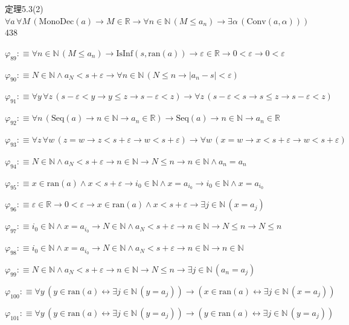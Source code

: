 \begin{fullproof}{定理5.3(2)}{$\forall a\,\forall M\,(\mathrm{MonoDec}(a) \to M \in \mathbb{R} \to \forall n \in \mathbb{N}\,(M \leq a_{n}) \to \exists \alpha\,(\mathrm{Conv}(a,\alpha)))$}{438}
\begin{abbrevlist}
\item $\varphi_{89} :\equiv \forall n \in \mathbb{N}\,(M \leq a_{n}) \to \mathrm{IsInf}(s,\mathrm{ran}(a)) \to \varepsilon \in \mathbb{R} \to 0 < \varepsilon \to 0 < \varepsilon$
\item $\varphi_{90} :\equiv N \in \mathbb{N} \land a_{N} < s + \varepsilon \to \forall n \in \mathbb{N}\,(N \leq n \to \lvert a_{n} - s \rvert < \varepsilon)$
\item $\varphi_{91} :\equiv \forall y\,\forall z\,(s - \varepsilon < y \to y \leq z \to s - \varepsilon < z) \to \forall z\,(s - \varepsilon < s \to s \leq z \to s - \varepsilon < z)$
\item $\varphi_{92} :\equiv \forall n\,(\mathrm{Seq}(a) \to n \in \mathbb{N} \to a_{n} \in \mathbb{R}) \to \mathrm{Seq}(a) \to n \in \mathbb{N} \to a_{n} \in \mathbb{R}$
\item $\varphi_{93} :\equiv \forall z\,\forall w\,(z = w \to z < s + \varepsilon \to w < s + \varepsilon) \to \forall w\,(x = w \to x < s + \varepsilon \to w < s + \varepsilon)$
\item $\varphi_{94} :\equiv N \in \mathbb{N} \land a_{N} < s + \varepsilon \to n \in \mathbb{N} \to N \leq n \to n \in \mathbb{N} \land a_{n} = a_{n}$
\item $\varphi_{95} :\equiv x \in \mathrm{ran}(a) \land x < s + \varepsilon \to i_{0} \in \mathbb{N} \land x = a_{i_{0}} \to i_{0} \in \mathbb{N} \land x = a_{i_{0}}$
\item $\varphi_{96} :\equiv \varepsilon \in \mathbb{R} \to 0 < \varepsilon \to x \in \mathrm{ran}(a) \land x < s + \varepsilon \to \exists j \in \mathbb{N}\,(x = a_{j})$
\item $\varphi_{97} :\equiv i_{0} \in \mathbb{N} \land x = a_{i_{0}} \to N \in \mathbb{N} \land a_{N} < s + \varepsilon \to n \in \mathbb{N} \to N \leq n \to N \leq n$
\item $\varphi_{98} :\equiv i_{0} \in \mathbb{N} \land x = a_{i_{0}} \to N \in \mathbb{N} \land a_{N} < s + \varepsilon \to n \in \mathbb{N} \to n \in \mathbb{N}$
\item $\varphi_{99} :\equiv N \in \mathbb{N} \land a_{N} < s + \varepsilon \to n \in \mathbb{N} \to N \leq n \to \exists j \in \mathbb{N}\,(a_{n} = a_{j})$
\item $\varphi_{100} :\equiv \forall y\,(y \in \mathrm{ran}(a) \leftrightarrow \exists j \in \mathbb{N}\,(y = a_{j})) \to (x \in \mathrm{ran}(a) \leftrightarrow \exists j \in \mathbb{N}\,(x = a_{j}))$
\item $\varphi_{101} :\equiv \forall y\,(y \in \mathrm{ran}(a) \leftrightarrow \exists j \in \mathbb{N}\,(y = a_{j})) \to (y \in \mathrm{ran}(a) \leftrightarrow \exists j \in \mathbb{N}\,(y = a_{j}))$

\end{abbrevlist}
\end{fullproof}
